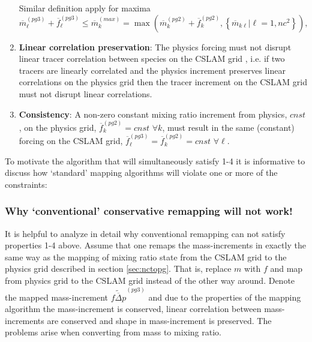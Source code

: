 \begin{enumerate}
Similar definition apply for maxima
\begin{equation}
\label{eq:max}
{\overline{m}}^{(pg3)}_\ell+{\overline{f}}^{(pg3)}_\ell \le \overline{m}_k^{(max)}=\max \left( {\overline{m}}^{(pg2)}_k+\overline{f}_k^{(pg2)},\left\{ {\overline{m}}_{k\ell} |\ell=1,nc^2\right\} \right),
\end{equation}
\item {\bf{Linear correlation preservation}}: The physics forcing must not disrupt linear tracer correlation between species on the CSLAM grid \citep[see, e.g., ][]{LT2011QJR}, i.e. if two tracers are linearly correlated and the physics increment preserves linear correlations on the physics grid then the tracer increment on the CSLAM grid must not disrupt linear correlations.
\item {\bf{Consistency}}: A non-zero constant mixing ratio increment from physics, $cnst$, on the physics grid, $\overline{f}_k^{(pg2)}=cnst$ $\forall k$, must result in the same (constant) forcing on the CSLAM grid, $\overline{f}_\ell^{(pg3)}=\overline{f}_k^{(pg2)}=cnst$ $\forall \ell$.
\end{enumerate}
To motivate the algorithm that will simultaneously satisfy 1-4 it is informative to discuss how `standard' mapping algorithms will violate one or more of the constraints:
\subsubsection{Why `conventional' conservative remapping will not work!}\label{sec:why}
It is helpful to analyze in detail why conventional remapping can not satisfy properties 1-4 above. Assume that one remaps the mass-increments in exactly the same way as the mapping of mixing ratio state from the CSLAM grid to the physics grid described in section \ref{sec:nctopg}. That is, replace $m$ with $f$ and map from physics grid to the CSLAM grid instead of the other way around. Denote the mapped mass-increment $\widetilde{\overline{f\Delta p}}^{(pg3)}$ and due to the properties of the mapping algorithm the mass-increment is conserved, linear correlation between mass-increments are conserved and shape in mass-increment is preserved. The problems arise when converting from mass to mixing ratio.
